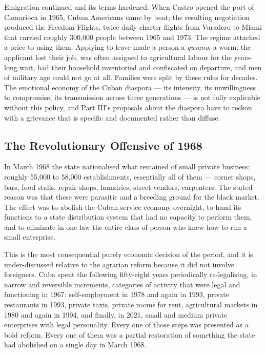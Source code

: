 Emigration continued and its terms hardened. When Castro opened the port of
Camarioca in 1965, Cuban Americans came by boat; the resulting negotiation
produced the Freedom Flights, twice-daily charter flights from Varadero to
Miami that carried roughly 300,000 people between 1965 and 1973.\unv{} The
regime attached a price to using them. Applying to leave made a person a
\emph{gusano}, a worm; the applicant lost their job, was often assigned to
agricultural labour for the years-long wait, had their household inventoried
and confiscated on departure, and men of military age could not go at all.
Families were split by these rules for decades. The emotional economy of the
Cuban diaspora --- its intensity, its unwillingness to compromise, its
transmission across three generations --- is not fully explicable without
this policy, and Part III's proposals about the diaspora have to reckon with a
grievance that is specific and documented rather than diffuse.

\subsection{The Revolutionary Offensive of 1968}

In March 1968 the state nationalised what remained of small private business:
roughly 55,000 to 58,000 establishments, essentially all of them --- corner
shops, bars, food stalls, repair shops, laundries, street vendors,
carpenters.\unv{} The stated reason was that these were parasitic and a
breeding ground for the black market. The effect was to abolish the Cuban
service economy overnight, to hand its functions to a state distribution system
that had no capacity to perform them, and to eliminate in one law the entire
class of person who knew how to run a small enterprise.

This is the most consequential purely economic decision of the period, and it
is under-discussed relative to the agrarian reform because it did not involve
foreigners. Cuba spent the following fifty-eight years periodically
re-legalising, in narrow and reversible increments, categories of activity that
were legal and functioning in 1967: self-employment in 1978 and again in 1993,
private restaurants in 1993, private taxis, private rooms for rent,
agricultural markets in 1980 and again in 1994, and finally, in 2021, small and
medium private enterprises with legal personality. Every one of those steps was
presented as a bold reform. Every one of them was a partial restoration of
something the state had abolished on a single day in March 1968.

